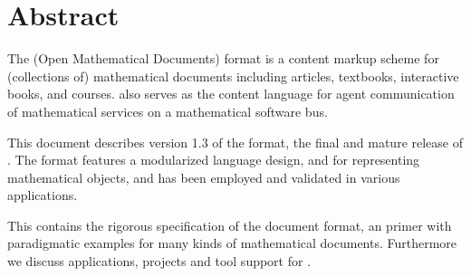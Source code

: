 
\section*{Abstract}
The {\omdoc} (Open Mathematical Documents) format is a content markup scheme for
(collections of) mathematical documents including articles, textbooks, interactive
books, and courses.  {\omdoc} also serves as the content language for agent
communication of mathematical services on a mathematical software bus.

This document describes version 1.3 of the {\omdoc} format, the final and mature
release of {}. The format features a modularized language design,
{\openmath} and {\mathml} for representing mathematical objects, and has been
employed and validated in various applications.

This {\report} contains the rigorous specification of the {\omdoc} document format, an
{\omdoc} primer with paradigmatic examples for many kinds of mathematical documents.
Furthermore we discuss applications, projects and tool support for {\omdoc}.



